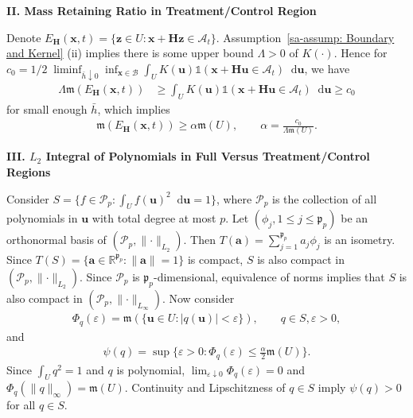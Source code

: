 \documentclass[10pt]{article}
\newcommand{\Indicator}{\mathds{1}}
\newcommand{\leb}{\mathfrak{m}}
\newcommand{\reals}{\mathbb{R}}
\newcommand{\dif}{\mathop{}\!\mathrm{d}}
\newcommand{\norm}[1]{\left\lVert#1\right\rVert}
\newcommand{\ba}{\mathbf{a}}
\newcommand{\bH}{\mathbf{H}}
\newcommand{\bu}{\mathbf{u}}
\newcommand{\bx}{\mathbf{x}}
\newcommand{\bz}{\mathbf{z}}
\newcommand{\A}{\mathcal{A}}
\newcommand{\B}{\mathcal{B}}
\begin{document}
\begin{center}
\textbf{II. Mass Retaining Ratio in Treatment/Control Region}
\end{center}

Denote $E_{\bH}(\bx,t) = \{\bz \in U: \bx + \bH \bz \in \A_t \}$. Assumption~\ref{sa-assump: Boundary and Kernel} (ii) implies there is some upper bound $\Lambda > 0$ of $K(\cdot)$. Hence for $c_0 = 1/2 \; \liminf_{\bar{h} \downarrow 0}\inf_{\bx \in \B} \int_{U} K(\bu) \Indicator(\bx + \bH \bu \in \A_t) \dif \bu$, we have
\begin{align*}
    \Lambda \leb(E_{\bH}(\bx,t))
    & \geq \int_{U} K(\bu) \Indicator(\bx + \bH \bu \in \A_t) \dif \bu
    \geq c_0
\end{align*}
for small enough $\bar{h}$, which implies
\begin{align}\label{sa-eq: mass relation}
      \leb(E_{\bH}(\bx,t))  \geq \alpha \leb(U), \qquad \alpha = \frac{c_0}{\Lambda \leb(U)}.
\end{align}

\begin{center}
\textbf{III. $L_2$ Integral of Polynomials in Full Versus Treatment/Control Regions}
\end{center}

Consider $S = \{f \in \mathcal{P}_{p}: \int_U f(\bu)^2 \dif \bu = 1\}$, where $\mathcal{P}_{p}$ is the collection of all polynomials in $\bu$ with total degree at most $p$. Let $(\phi_j, 1 \leq j \leq \mathfrak{p}_p)$ be an orthonormal basis of $(\mathcal{P}_{p}, \lVert \cdot \rVert_{L_2})$. Then $T(\mathbf{a}) = \sum_{j = 1}^{\mathfrak{p}_p} a_j \phi_j$ is an isometry. Since $T(S) = \{\mathbf{a} \in \reals^{\mathfrak{p}_p}: \norm{\ba} = 1\}$ is compact, $S$ is also compact in $(\mathcal{P}_{p}, \lVert \cdot \rVert_{L_2})$. Since $\mathcal{P}_{p}$ is $\mathfrak{p}_p$-dimensional, equivalence of norms implies that $S$ is also compact in $(\mathcal{P}_{p}, \lVert \cdot \rVert_{L_{\infty}})$. Now consider
\begin{align*}
    \Phi_q(\varepsilon) = \leb(\{\bu \in U: |q(\bu)| < \varepsilon \}), \qquad q \in S, \varepsilon > 0,
\end{align*}
and
\begin{align*}
    \psi(q) = \sup \Big\{\varepsilon > 0: \Phi_q(\varepsilon) \leq \frac{\alpha}{2} \leb(U) \Big\}.
\end{align*}
Since $\int_U q^2 = 1$ and $q$ is polynomial, $\lim_{\varepsilon \downarrow 0} \Phi_q(\varepsilon) = 0$ and $\Phi_q(\lVert q\rVert_{\infty}) = \leb(U)$. Continuity and Lipschitzness of $q \in S$ imply $\psi(q) > 0$ for all $q \in S$.
\end{document}
